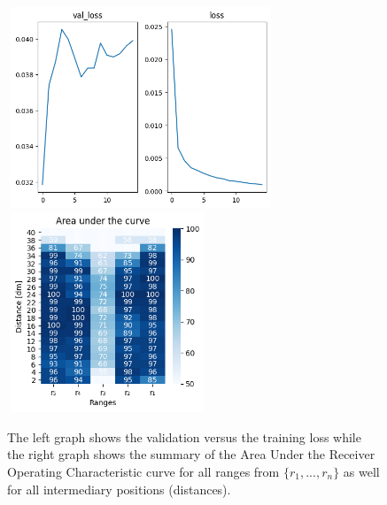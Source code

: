 \begin{multicols}{2}
\begin{itemize}
\end{itemize}
\end{multicols}\begin{figure}[H]%
\centering
\includegraphics[width=8cm,height=6cm]{3_models/models_41/graph_41.png}
\hspace{0.2 cm}
\includegraphics[width=6cm,height=6cm]{4_plots/plots_41/AUC_41.png}
\caption{The left graph shows the validation versus the training loss while the right graph shows the summary of the Area Under the Receiver Operating Characteristic curve for all ranges from $\{r_{1}, ... ,r_{n}\}$ as well for all intermediary positions (distances).}
\label{auc_41}
\end{figure}


\newpage
